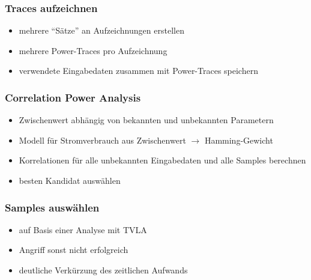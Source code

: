 \documentclass[ngerman]{beamer}
\begin{document}
\begin{frame}

    \frametitle{Traces aufzeichnen}


    \begin{itemize}
        \item mehrere ``Sätze'' an Aufzeichnungen erstellen
        \item mehrere Power-Traces pro Aufzeichnung
        \item verwendete Eingabedaten zusammen mit Power-Traces speichern
    \end{itemize}

\end{frame}



\begin{frame}

    \frametitle{Correlation Power Analysis}


    \begin{itemize}
        \item Zwischenwert abhängig von bekannten und unbekannten Parametern
        \item Modell für Stromverbrauch aus Zwischenwert $\rightarrow$
            Hamming-Gewicht
        \item Korrelationen für alle unbekannten Eingabedaten und alle Samples berechnen
        \item besten Kandidat auswählen
    \end{itemize}

\end{frame}



\begin{frame}

    \frametitle{Samples auswählen}


    \begin{itemize}
        \item auf Basis einer Analyse mit TVLA
        \item Angriff sonst nicht erfolgreich
        \item deutliche Verkürzung des zeitlichen Aufwands
    \end{itemize}

\end{frame}
\end{document}
